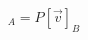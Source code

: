 \documentclass[preview]{standalone}
\begin{document}
\begin{align*}
[\vec{v}]_A = P [\vec{v}]_B
\end{align*}
\end{document}
